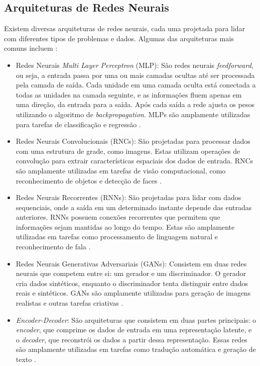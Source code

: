 \subsection{Arquiteturas de Redes Neurais}
Existem diversas arquiteturas de redes neurais, cada uma projetada para lidar com diferentes tipos de problemas e dados. Algumas das arquiteturas mais comuns incluem \cite{arquiteturas}:
\label{sec:arquiteturas}
\begin{itemize}
    \item Redes Neurais \textit{Multi Layer Perceptron} (MLP): São redes neurais \textit{feedforward}, ou seja, a entrada passa por uma ou mais camadas ocultas até ser processada pela camada de saída. Cada unidade em uma camada oculta está conectada a todas as unidades na camada seguinte, e as informações fluem apenas em uma direção, da entrada para a saída. Após cada saída a rede ajusta os pesos utilizando o algoritmo de \textit{backpropagation}. MLPs são amplamente utilizadas para tarefas de classificação e regressão \cite{arquiteturas}.
    
    \item Redes Neurais Convolucionais (RNCs): São projetadas para processar dados com uma estrutura de grade, como imagens. Estas utilizam operações de convolução para extrair características espaciais dos dados de entrada. RNCs são amplamente utilizadas em tarefas de visão computacional, como reconhecimento de objetos e detecção de faces \cite{arquiteturas}. 
    
    \item Redes Neurais Recorrentes (RNNs): São projetadas para lidar com dados sequenciais, onde a saída em um determinado instante depende das entradas anteriores. RNNs possuem conexões recorrentes que permitem que informações sejam mantidas ao longo do tempo. Estas são amplamente utilizadas em tarefas como processamento de linguagem natural e reconhecimento de fala \cite{arquiteturas}.
    
    \item Redes Neurais Generativas Adversariais (GANs): Consistem em duas redes neurais que competem entre si: um gerador e um discriminador. O gerador cria dados sintéticos, enquanto o discriminador tenta distinguir entre dados reais e sintéticos. GANs são amplamente utilizadas para geração de imagens realistas e outras tarefas criativas \cite{arquiteturas}.
    
    \item \textit{Encoder-Decoder}: São arquiteturas que consistem em duas partes principais: o \textit{encoder}, que comprime os dados de entrada em uma representação latente, e o \textit{decoder}, que reconstrói os dados a partir dessa representação. Essas redes são amplamente utilizadas em tarefas como tradução automática e geração de texto \cite{arquiteturas}.
\end{itemize}
